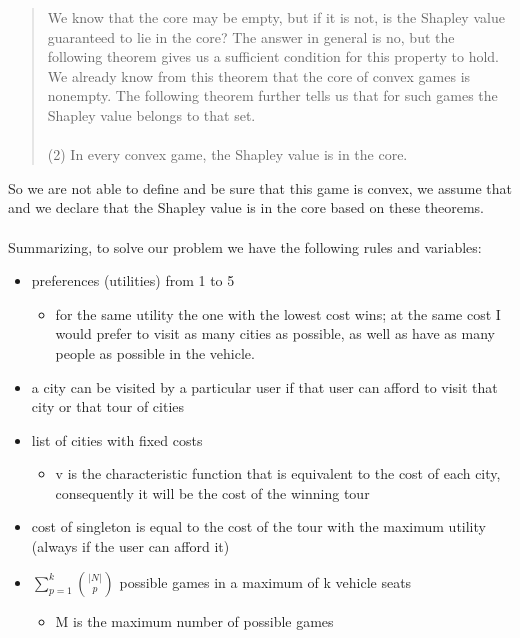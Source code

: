 \documentclass{article}
\begin{document}
{\begin{quote}
    We know that the core may be empty, but if it is not, is the Shapley value guaranteed to lie in the core? The answer in general is no, but the following theorem gives us a sufficient condition for this property to hold. We already know from this theorem that the core of convex games is nonempty. The following theorem further tells us that for such games the Shapley value belongs to that set.\\\\
    (2) In every convex game, the Shapley value is in the core.
\end{quote}
So we are not able to define and be sure that this game is convex, we assume that and we declare that the Shapley value is in the core based on these theorems.\\\\
Summarizing, to solve our problem we have the following rules and variables:
\begin{itemize}
    \item preferences (utilities) from 1 to 5
    \begin{itemize}
        \item for the same utility the one with the lowest cost wins; at the same cost I would prefer to visit as many cities as possible, as well as have as many people as possible in the vehicle.
    \end{itemize}
    \item a city can be visited by a particular user if that user can afford to visit that city or that tour of cities
    \item list of cities with fixed costs
     \begin{itemize}
        \item v is the characteristic function that is equivalent to the cost of each city, consequently it will be the cost of the winning tour
    \end{itemize}
    \item cost of singleton is equal to the cost of the tour with the maximum utility (always if the user can afford it)
    \item  $\displaystyle\sum_{p=1}^k \binom {{\vert N \vert}} {p}$ possible games in a maximum of k vehicle seats
     \begin{itemize}
        \item M is the maximum number of possible games
    \end{itemize}
\end{itemize}
}
\end{document}
